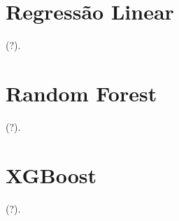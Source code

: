 \section{Regressão Linear}
\label{sec:regressao_linear}

(?).

\section{Random Forest}
\label{sec:random_forest}

(?).

\section{XGBoost}
\label{sec:xgboost}

(?).

